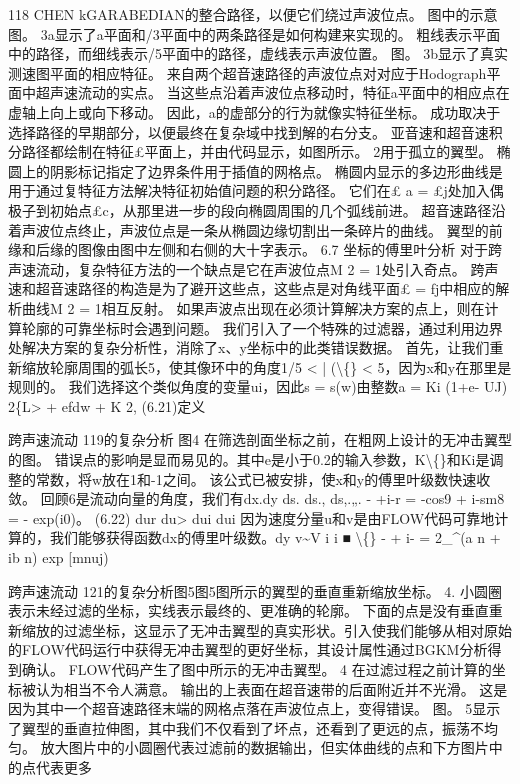 \documentclass[UTF8,11pt,a4paper,openany,fontset=fandol]{ctexbook}
\begin{document}
118 CHEN kGARABEDIAN的整合路径，以便它们绕过声波位点。 图中的示意图。 3a显示了a平面和/3平面中的两条路径是如何构建来实现的。 粗线表示平面中的路径，而细线表示/5平面中的路径，虚线表示声波位置。 图。 3b显示了真实测速图平面的相应特征。 来自两个超音速路径的声波位点对对应于Hodograph平面中超声速流动的实点。 当这些点沿着声波位点移动时，特征a平面中的相应点在虚轴上向上或向下移动。 因此，a的虚部分的行为就像实特征坐标。 成功取决于选择路径的早期部分，以便最终在复杂域中找到解的右分支。 亚音速和超音速积分路径都绘制在特征£平面上，并由代码显示，如图所示。 2用于孤立的翼型。 椭圆上的阴影标记指定了边界条件用于插值的网格点。 椭圆内显示的多边形曲线是用于通过复特征方法解决特征初始值问题的积分路径。 它们在£ a = £j处加入偶极子到初始点£c，从那里进一步的段向椭圆周围的几个弧线前进。 超音速路径沿着声波位点终止，声波位点是一条从椭圆边缘切割出一条碎片的曲线。 翼型的前缘和后缘的图像由图中左侧和右侧的大十字表示。 6.7 坐标的傅里叶分析 对于跨声速流动，复杂特征方法的一个缺点是它在声波位点M 2 = 1处引入奇点。 跨声速和超音速路径的构造是为了避开这些点，这些点是对角线平面£ = fj中相应的解析曲线M 2 = 1相互反射。 如果声波点出现在必须计算解决方案的点上，则在计算轮廓的可靠坐标时会遇到问题。 我们引入了一个特殊的过滤器，通过利用边界处解决方案的复杂分析性，消除了x、y坐标中的此类错误数据。 首先，让我们重新缩放轮廓周围的弧长5，使其像环中的角度1/5 < | (\textbackslash\{\} < 5，因为x和y在那里是规则的。 我们选择这个类似角度的变量ui，因此s = s(w)由整数a = Ki (1+e- UJ) 2\{L> + efdw + K 2, (6.21)定义

跨声速流动 119的复杂分析 图4 在筛选剖面坐标之前，在粗网上设计的无冲击翼型的图。 错误点的影响是显而易见的。其中e是小于0.2的输入参数，K\textbackslash\{\}和Ki是调整的常数，将w放在1和-1之间。 该公式已被安排，使x和y的傅里叶级数快速收敛。 回顾6是流动向量的角度，我们有dx.dy ds. ds., ds,.„. - +i-r = -cos9 + i-sm8 = - exp(i0)。 (6.22) dur du> dui dui 因为速度分量u和v是由FLOW代码可靠地计算的，我们能够获得函数dx的傅里叶级数。dy v\textasciitilde{}V i i ■ \textbackslash\{\} - + i- = 2\_\textasciicircum{}(a n + ib n) exp [mnuj)

跨声速流动 121的复杂分析图5图5图所示的翼型的垂直重新缩放坐标。 4. 小圆圈表示未经过滤的坐标，实线表示最终的、更准确的轮廓。 下面的点是没有垂直重新缩放的过滤坐标，这显示了无冲击翼型的真实形状。引入使我们能够从相对原始的FLOW代码运行中获得无冲击翼型的更好坐标，其设计属性通过BGKM分析得到确认。 FLOW代码产生了图中所示的无冲击翼型。 4 在过滤过程之前计算的坐标被认为相当不令人满意。 输出的上表面在超音速带的后面附近并不光滑。 这是因为其中一个超音速路径末端的网格点落在声波位点上，变得错误。 图。 5显示了翼型的垂直拉伸图，其中我们不仅看到了坏点，还看到了更远的点，振荡不均匀。 放大图片中的小圆圈代表过滤前的数据输出，但实体曲线的点和下方图片中的点代表更多
\end{document}

